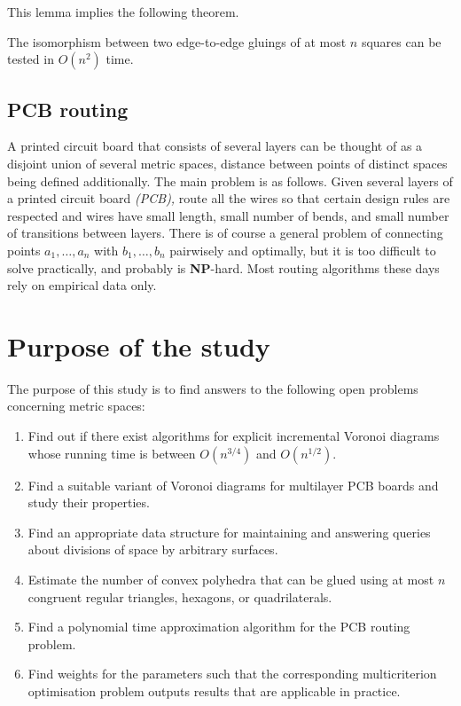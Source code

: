 \documentclass[a4paper,11pt]{article}
\begin{document}
This lemma implies the following theorem.

\begin{theorem} \label{thm:chruntime}
	The isomorphism between two edge-to-edge gluings of at most $n$ squares can be tested in $O(n^2)$ time.
\end{theorem}

\subsection{PCB routing}

A printed circuit board that consists of several layers can be thought of as a disjoint union of several metric spaces, distance between points of distinct spaces being defined additionally. The main problem is as follows. Given several layers of a printed circuit board {\it (PCB),} route all the wires so that certain design rules are respected and wires have small length, small number of bends, and small number of transitions between layers. There is of course a general problem of connecting points $a_1, \ldots, a_n$ with $b_1, \ldots, b_n$ pairwisely and optimally, but it is too difficult to solve practically, and probably is {\bf NP}-hard. Most routing algorithms these days rely on empirical data only.

\section{Purpose of the study}

	The purpose of this study is to find answers to the following open problems concerning metric spaces:

\begin{enumerate}
	\item Find out if there exist algorithms for explicit incremental Voronoi diagrams whose running time is between \(O(n^{3/4})\) and \(O(n^{1/2})\).
	\item Find a suitable variant of Voronoi diagrams for multilayer PCB boards and study their properties.
	\item Find an appropriate data structure for maintaining and answering queries about divisions of space by arbitrary surfaces.
	\item Estimate the number of convex polyhedra that can be glued using at most \(n\) congruent regular triangles, hexagons, or quadrilaterals.
	\item Find a polynomial time approximation algorithm for the PCB routing problem.
	\item Find weights for the parameters such that the corresponding multicriterion optimisation problem outputs results that are applicable in practice.
\end{enumerate}
\end{document}
